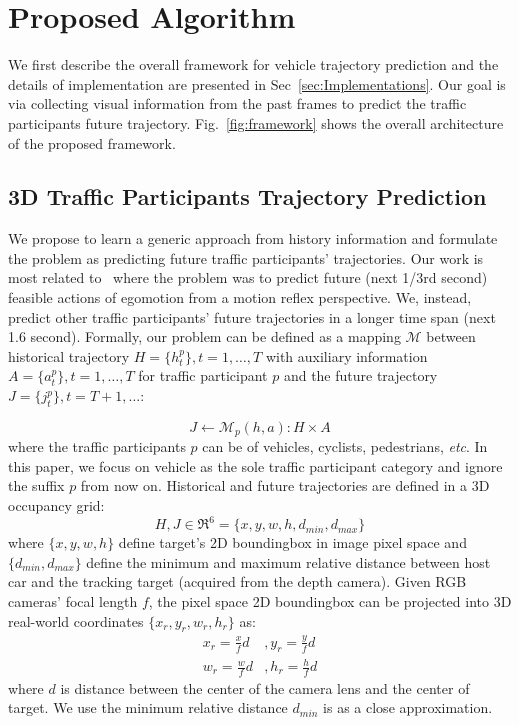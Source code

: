 \documentclass[10pt,twocolumn,letterpaper]{article}
\begin{document}
 \section{Proposed Algorithm}

We first describe the overall framework for vehicle trajectory prediction and the details of implementation are presented in Sec~\ref{sec:Implementations}.
Our goal is via collecting visual information from the past frames to predict the traffic participants future trajectory. Fig.~\ref{fig:framework} shows the overall architecture of the proposed framework.

\subsection{3D Traffic Participants Trajectory Prediction}

We propose to learn a generic approach from history information and formulate the problem as predicting future traffic participants' trajectories.
Our work is most related to~\cite{xu2017end} where the problem was to predict future (next 1/3rd second) feasible actions of egomotion from a motion reflex perspective.
We, instead,  predict other traffic participants' future trajectories in a longer time span (next 1.6 second).
Formally, our problem can be defined as a mapping $\mathcal{M}$ between historical trajectory $H=\{h_t^p\}, t=1,\dots, T $ with auxiliary information $ A=\{a_t^p\}, t=1,\dots, T $ for traffic participant $p$ and the future trajectory $J=\{j_t^p\}, t={T+1}, \ldots$:

\begin{equation}
J \leftarrow \bm{\mathcal{M}}_p(h, a): H \times A
\label{eq:mapping}
\end{equation}
where the traffic participants $p$ can be of vehicles, cyclists, pedestrians, \emph{etc}. In this paper, we focus on vehicle as the sole traffic participant category and ignore the suffix $p$ from now on. Historical and future trajectories are defined in a 3D occupancy grid:
\begin{equation}
H, J \in \Re^{6} =  \{x, y, w, h, d_{min}, d_{max}\}
\label{eq:mapping2}
\end{equation}
where $\{x,y,w,h\}$ define target's 2D boundingbox in image pixel space and $\{d_{min}, d_{max}\}$ define the minimum and maximum relative distance between host car and the tracking target (acquired from the depth camera). Given RGB cameras' focal length $f$, the pixel space 2D boundingbox can be projected into 3D real-world coordinates $\{x_r,y_r,w_r,h_r\}$ as:
\begin{align}
    x_r = \frac{x}{f}d &, y_r = \frac{y}{f} d  \label{eq:focal_length_1}  \\
    w_r = \frac{w}{f}d &, h_r = \frac{h}{f} d
    \label{eq:focal_length_2}
\end{align}
where $d$ is distance between  the center of the camera lens and the center of target. We use the minimum relative distance $d_{min}$ is as a close approximation.
\end{document}
